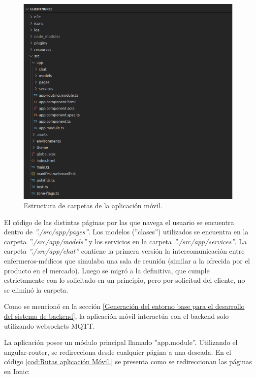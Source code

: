 \begin{figure}[ht]
	\centering
	\includegraphics[scale=.60]{./Figures/app/estructura-app.png}
	\caption{ Estructura de carpetas de la aplicación móvil.}
	\label{fig: Estructura de código fuente de la aplicación móvil.}
\end{figure} 

El código de las distintas páginas por las que navega el usuario se encuentra dentro de \textit{''./src/app/pages''}. Los modelos (''clases'') utilizados se encuentra en la carpeta \textit{''./src/app/models''} y los servicios en la carpeta \textit{''./src/app/services''}. La carpeta \textit{''./src/app/chat''} contiene la primera versión la intercomunicación entre enfermeros-médicos que simulaba una sala de reunión  (similar a la ofrecida por el producto en el mercado). Luego se migró a la definitiva, que cumple estrictamente con lo solicitado en un principio, pero por solicitud del cliente, no se eliminó la carpeta.

Como se mencionó en la sección \ref{Generación del entorno base para el desarrollo del sistema de backend}, la aplicación móvil interactúa con el backend solo utilizando websockets MQTT.

La aplicación posee un módulo principal llamado ''app.module''. Utilizando el angular-router, se redirecciona desde cualquier página a una deseada. En el código \ref{cod:Rutas aplicación Móvil.} se presenta como se redireccionan las páginas en Ionic:

